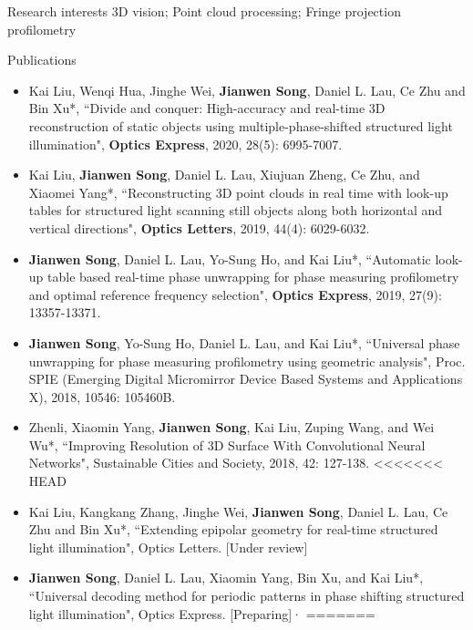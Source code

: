 \documentclass{resume} %
\begin{document}
\begin{rSection}{Research interests}
3D vision; Point cloud processing; Fringe projection profilometry
\end{rSection}
\begin{rSection}{Publications}

\begin{itemize}[leftmargin=*]
\item Kai Liu, Wenqi Hua, Jinghe Wei, {\bf Jianwen Song}, Daniel L. Lau, Ce Zhu and Bin Xu*, ``Divide and conquer: High-accuracy and real-time 3D reconstruction of static objects using multiple-phase-shifted structured light illumination", {\bf Optics Express}, 2020, 28(5): 6995-7007.
\item Kai Liu, {\bf Jianwen Song}, Daniel L. Lau, Xiujuan Zheng, Ce Zhu, and Xiaomei Yang*, ``Reconstructing 3D point clouds in real time with look-up tables for structured light scanning still objects along both horizontal and vertical directions", {\bf Optics Letters}, 2019, 44(4): 6029-6032.
\item {\bf Jianwen Song}, Daniel L. Lau, Yo-Sung Ho, and Kai Liu*, ``Automatic look-up table based real-time phase unwrapping for phase measuring profilometry and optimal reference frequency selection", {\bf Optics Express}, 2019, 27(9): 13357-13371.
\item {\bf Jianwen Song}, Yo-Sung Ho, Daniel L. Lau, and Kai Liu*, ``Universal phase unwrapping for phase measuring profilometry using geometric analysis", Proc. SPIE (Emerging Digital Micromirror Device Based Systems and Applications X), 2018, 10546: 105460B.
\item Zhenli, Xiaomin Yang, {\bf Jianwen Song}, Kai Liu, Zuping Wang, and Wei Wu*, ``Improving Resolution of 3D Surface With Convolutional Neural Networks", Sustainable Cities and Society, 2018, 42: 127-138.
<<<<<<< HEAD
\item Kai Liu, Kangkang Zhang, Jinghe Wei, {\bf Jianwen Song}, Daniel L. Lau, Ce Zhu and Bin Xu*, ``Extending epipolar geometry for real-time structured light illumination", Optics Letters. [Under review]
\item {\bf Jianwen Song}, Daniel L. Lau, Xiaomin Yang, Bin Xu, and Kai Liu*, ``Universal decoding method for periodic patterns in phase shifting structured light illumination", Optics Express. [Preparing]·
=======

\end{itemize}
\end{rSection}
\end{document}
